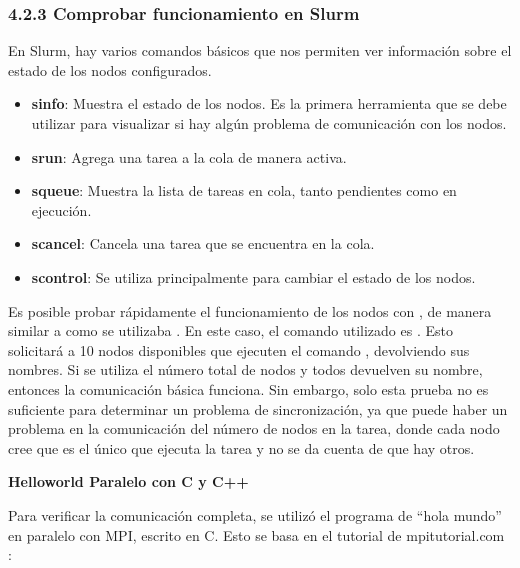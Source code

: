 \begin{spacing}{1.5}
  \subsubsection {4.2.3 Comprobar funcionamiento en Slurm}

  En Slurm, hay varios comandos básicos que nos permiten ver información sobre
  el
  estado de los nodos configurados.

  \begin{itemize}
    \item \textbf{sinfo}: Muestra el estado de los nodos. Es la primera
          herramienta que se debe utilizar para visualizar si hay algún
          problema de
          comunicación con los nodos.
    \item \textbf{srun}: Agrega una tarea a la cola de manera activa.
    \item \textbf{squeue}: Muestra la lista de tareas en cola, tanto pendientes
          como en ejecución.
    \item \textbf{scancel}: Cancela una tarea que se encuentra en la cola.
    \item \textbf{scontrol}: Se utiliza principalmente para cambiar el estado
          de los nodos.
  \end{itemize}

  Es posible probar rápidamente el funcionamiento de los nodos con ,
  de manera similar a como se utilizaba . En este caso, el comando
  utilizado es . Esto solicitará a 10 nodos
  disponibles
  que ejecuten el comando , devolviendo sus nombres. Si se
  utiliza
  el número total de nodos y todos devuelven su nombre, entonces la
  comunicación
  básica funciona. Sin embargo, solo esta prueba no es suficiente para
  determinar
  un problema de sincronización, ya que puede haber un problema en la
  comunicación del número de nodos en la tarea, donde cada nodo cree que es el
  único que ejecuta la tarea y no se da cuenta de que hay otros.

  \textbf{Helloworld Paralelo con C y C++}

  Para verificar la comunicación completa, se utilizó el programa de ``hola
  mundo''
  en paralelo con MPI, escrito en C. Esto se basa en el tutorial de
  mpitutorial.com \cite{HelloC}:



\end{spacing}
